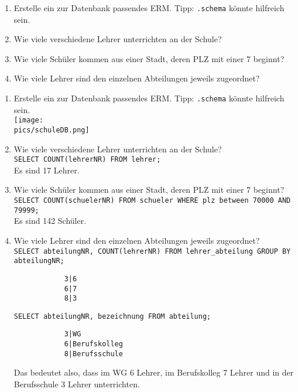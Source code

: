 \begin{Exercise}[title={Bearbeite folgende Aufgaben}, label=Funktionen]
	\begin{enumerate}
		\item Erstelle ein zur Datenbank passendes ERM. Tipp: \lstinline!.schema! könnte hilfreich sein.
		\item Wie viele verschiedene Lehrer unterrichten an der Schule?
		\item Wie viele Schüler kommen aus einer Stadt, deren PLZ mit einer 7 beginnt?
		\item Wie viele Lehrer sind den einzelnen Abteilungen jeweils zugeordnet?
	\end{enumerate}
\end{Exercise}
\begin{Answer}[ref=Funktionen]
	\begin{enumerate}
		\item Erstelle ein zur Datenbank passendes ERM. Tipp: \lstinline!.schema! könnte hilfreich sein.\\
		\texttt{[image: \\pics/schuleDB.png]}
		\item Wie viele verschiedene Lehrer unterrichten an der Schule?\\
		\lstinline!SELECT COUNT(lehrerNR) FROM lehrer;!\\
		Es sind 17 Lehrer.
		\item Wie viele Schüler kommen aus einer Stadt, deren PLZ mit einer 7 beginnt?\\
		\lstinline!SELECT COUNT(schuelerNR) FROM schueler WHERE plz between 70000 AND 79999;!\\
		Es sind 142 Schüler.
		\item Wie viele Lehrer sind den einzelnen Abteilungen jeweils zugeordnet?\\
		\lstinline!SELECT abteilungNR, COUNT(lehrerNR) FROM lehrer_abteilung GROUP BY abteilungNR;!\\
		\begin{lstlisting}
			3|6
			6|7
			8|3\end{lstlisting}
		\lstinline!SELECT abteilungNR, bezeichnung FROM abteilung;!\\
		\begin{lstlisting}
			3|WG
			6|Berufskolleg
			8|Berufsschule\end{lstlisting}
		Das bedeutet also, dass im WG 6 Lehrer, im Berufskolleg 7 Lehrer und in der Berufsschule 3 Lehrer unterrichten.
	\end{enumerate}
\end{Answer}